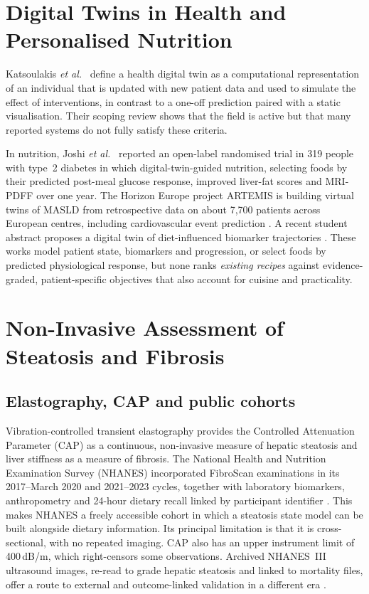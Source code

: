 \section{Digital Twins in Health and Personalised Nutrition}
\label{sec:lr-dt}

Katsoulakis \emph{et al.}\ \cite{katsoulakis2024} define a health digital twin as a computational representation of an individual that is updated with new patient data and used to simulate the effect of interventions, in contrast to a one-off prediction paired with a static visualisation. Their scoping review shows that the field is active but that many reported systems do not fully satisfy these criteria.

In nutrition, Joshi \emph{et al.}\ \cite{joshi2023} reported an open-label randomised trial in 319 people with type~2 diabetes in which digital-twin-guided nutrition, selecting foods by their predicted post-meal glucose response, improved liver-fat scores and MRI-PDFF over one year. The Horizon Europe project ARTEMIS is building virtual twins of MASLD from retrospective data on about 7{,}700 patients across European centres, including cardiovascular event prediction \cite{artemis}. A recent student abstract proposes a digital twin of diet-influenced biomarker trajectories \cite{idtdiet}. These works model patient state, biomarkers and progression, or select foods by predicted physiological response, but none ranks \emph{existing recipes} against evidence-graded, patient-specific objectives that also account for cuisine and practicality.

\section{Non-Invasive Assessment of Steatosis and Fibrosis}
\label{sec:lr-ml}

\subsection{Elastography, CAP and public cohorts}

Vibration-controlled transient elastography provides the Controlled Attenuation Parameter (CAP) as a continuous, non-invasive measure of hepatic steatosis and liver stiffness as a measure of fibrosis. The National Health and Nutrition Examination Survey (NHANES) incorporated FibroScan examinations in its 2017--March 2020 and 2021--2023 cycles, together with laboratory biomarkers, anthropometry and 24-hour dietary recall linked by participant identifier \cite{nhanes_lux}. This makes NHANES a freely accessible cohort in which a steatosis state model can be built alongside dietary information. Its principal limitation is that it is cross-sectional, with no repeated imaging. CAP also has an upper instrument limit of 400\,dB/m, which right-censors some observations. Archived NHANES~III ultrasound images, re-read to grade hepatic steatosis and linked to mortality files, offer a route to external and outcome-linked validation in a different era \cite{nhanes3}.

